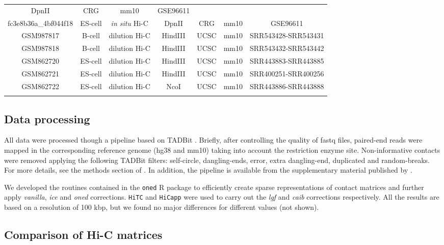 \documentclass{bioinfo}
\begin{document}
\begin{methods}
\begin{table}
{\begin{tabular}{ccccccc}
  DpnII & CRG & mm10 & GSE96611 \\
fc3e8b36a\_4bf044f18 & ES-cell & \textit{in situ} Hi-C &
  DpnII & CRG & mm10 & GSE96611 \\
GSM987817 & B-cell  & dilution Hi-C &
  HindIII & UCSC & mm10 & SRR543428-SRR543431 \\
GSM987818 & B-cell  & dilution Hi-C &
  HindIII & UCSC & mm10 & SRR543432-SRR543442 \\
GSM862720 & ES-cell & dilution Hi-C &
  HindIII & UCSC & mm10 & SRR443883-SRR443885 \\
GSM862721 & ES-cell & dilution Hi-C &
  HindIII & UCSC & mm10 & SRR400251-SRR400256 \\
GSM862722 & ES-cell & dilution Hi-C &
  NcoI    & UCSC & mm10 & SRR443886-SRR443888 \\
  \botrule
\end{tabular}}{}
\end{table}

\subsection{Data processing}

All data were processed though a pipeline based on TADBit
\citep{serra2016structural}. Briefly, after controlling the quality of
fastq files, paired-end reads were mapped in the corresponding reference
genome (hg38 and mm10) taking into account the restriction enzyme site.
Non-informative contacts were removed applying the following TADBit
filters: self-circle, dangling-ends, error, extra dangling-end, duplicated
and random-breaks. For more details, see the methods section of
\cite{stadhouders2017transcription}. In addition, the pipeline is
available from the supplementary material published by
\cite{quilez2017managing}.

We developed the routines contained in the \texttt{oned} R package to
efficiently create sparse representations of contact matrices and further
apply \textit{vanilla}, \textit{ice} and \textit{oned} corrections.
\texttt{HiTC} \citep{servant2012hitc} and \texttt{HiCapp}
\citep{wu2016computational} were used to carry out the \textit{lgf} and
\textit{caib} corrections respectively. All the results are based on a
resolution of 100 kbp, but we found no major differences for different
values (not shown).



\subsection{Comparison of Hi-C matrices}
\label{sec:comp}


\end{methods}
\end{document}
